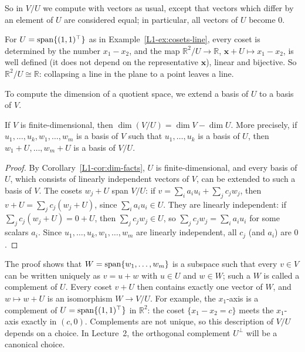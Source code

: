 So in $V/U$ we compute with vectors as usual, except that vectors which differ by an element of $U$ are considered equal; in particular, all vectors of $U$ become $0$.

\begin{example}
    For $U = \operatorname{span}\{(1, 1)^\top\}$ as in Example~\ref{L1-ex:cosets-line}, every coset is determined by the number $x_1 - x_2$, and the map $\mathbb{R}^2/U \to \mathbb{R}$, $\mathbf{x} + U \mapsto x_1 - x_2$, is well defined (it does not depend on the representative $\mathbf{x}$), linear and bijective. So $\mathbb{R}^2/U \cong \mathbb{R}$: collapsing a line in the plane to a point leaves a line.
\end{example}

To compute the dimension of a quotient space, we extend a basis of $U$ to a basis of $V$.

\begin{theorem}\label{L1-thm:quotient-dim}
    If $V$ is finite-dimensional, then $\dim(V/U) = \dim V - \dim U$. More precisely, if $u_1, \ldots, u_k, w_1, \ldots, w_m$ is a basis of $V$ such that $u_1, \ldots, u_k$ is a basis of $U$, then $w_1 + U, \ldots, w_m + U$ is a basis of $V/U$.
\end{theorem}

\begin{proof}
    By Corollary~\ref{L1-cor:dim-facts}, $U$ is finite-dimensional, and every basis of $U$, which consists of linearly independent vectors of $V$, can be extended to such a basis of $V$. The cosets $w_j + U$ span $V/U$: if $v = \sum_i a_i u_i + \sum_j c_j w_j$, then $v + U = \sum_j c_j (w_j + U)$, since $\sum_i a_i u_i \in U$. They are linearly independent: if $\sum_j c_j (w_j + U) = 0 + U$, then $\sum_j c_j w_j \in U$, so $\sum_j c_j w_j = \sum_i a_i u_i$ for some scalars $a_i$. Since $u_1, \ldots, u_k, w_1, \ldots, w_m$ are linearly independent, all $c_j$ (and $a_i$) are $0$.
\end{proof}

\begin{remark}[Complements]
    The proof shows that $W = \operatorname{span}\{w_1, \ldots, w_m\}$ is a subspace such that every $v \in V$ can be written uniquely as $v = u + w$ with $u \in U$ and $w \in W$; such a $W$ is called a complement of $U$. Every coset $v + U$ then contains exactly one vector of $W$, and $w \mapsto w + U$ is an isomorphism $W \to V/U$. For example, the $x_1$-axis is a complement of $U = \operatorname{span}\{(1, 1)^\top\}$ in $\mathbb{R}^2$: the coset $\{x_1 - x_2 = c\}$ meets the $x_1$-axis exactly in $(c, 0)$. Complements are not unique, so this description of $V/U$ depends on a choice. In Lecture~2, the orthogonal complement $U^\perp$ will be a canonical choice.
\end{remark}


